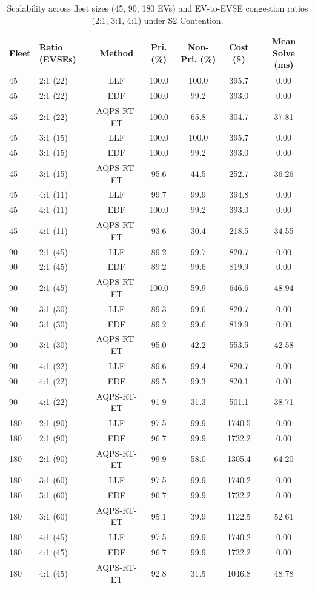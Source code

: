 \begin{table}[htbp]
\centering
\caption{Scalability across fleet sizes (45, 90, 180 EVs) and EV-to-EVSE congestion ratios (2:1, 3:1, 4:1) under S2 Contention.}
\label{tab:scalability}
\footnotesize
\begin{tabular}{llccccc}
\toprule
Fleet & Ratio (EVSEs) & Method & Pri. (\%) & Non-Pri. (\%) & Cost (\$) & Mean Solve (ms) \\
\midrule
45 & 2:1 (22) & LLF & 100.0 & 100.0 & 395.7 & 0.00 \\
45 & 2:1 (22) & EDF & 100.0 & 99.2 & 393.0 & 0.00 \\
45 & 2:1 (22) & AQPS-RT-ET & 100.0 & 65.8 & 304.7 & 37.81 \\
45 & 3:1 (15) & LLF & 100.0 & 100.0 & 395.7 & 0.00 \\
45 & 3:1 (15) & EDF & 100.0 & 99.2 & 393.0 & 0.00 \\
45 & 3:1 (15) & AQPS-RT-ET & 95.6 & 44.5 & 252.7 & 36.26 \\
45 & 4:1 (11) & LLF & 99.7 & 99.9 & 394.8 & 0.00 \\
45 & 4:1 (11) & EDF & 100.0 & 99.2 & 393.0 & 0.00 \\
45 & 4:1 (11) & AQPS-RT-ET & 93.6 & 30.4 & 218.5 & 34.55 \\
90 & 2:1 (45) & LLF & 89.2 & 99.7 & 820.7 & 0.00 \\
90 & 2:1 (45) & EDF & 89.2 & 99.6 & 819.9 & 0.00 \\
90 & 2:1 (45) & AQPS-RT-ET & 100.0 & 59.9 & 646.6 & 48.94 \\
90 & 3:1 (30) & LLF & 89.3 & 99.6 & 820.7 & 0.00 \\
90 & 3:1 (30) & EDF & 89.2 & 99.6 & 819.9 & 0.00 \\
90 & 3:1 (30) & AQPS-RT-ET & 95.0 & 42.2 & 553.5 & 42.58 \\
90 & 4:1 (22) & LLF & 89.6 & 99.4 & 820.7 & 0.00 \\
90 & 4:1 (22) & EDF & 89.5 & 99.3 & 820.1 & 0.00 \\
90 & 4:1 (22) & AQPS-RT-ET & 91.9 & 31.3 & 501.1 & 38.71 \\
180 & 2:1 (90) & LLF & 97.5 & 99.9 & 1740.5 & 0.00 \\
180 & 2:1 (90) & EDF & 96.7 & 99.9 & 1732.2 & 0.00 \\
180 & 2:1 (90) & AQPS-RT-ET & 99.9 & 58.0 & 1305.4 & 64.20 \\
180 & 3:1 (60) & LLF & 97.5 & 99.9 & 1740.2 & 0.00 \\
180 & 3:1 (60) & EDF & 96.7 & 99.9 & 1732.2 & 0.00 \\
180 & 3:1 (60) & AQPS-RT-ET & 95.1 & 39.9 & 1122.5 & 52.61 \\
180 & 4:1 (45) & LLF & 97.5 & 99.9 & 1740.2 & 0.00 \\
180 & 4:1 (45) & EDF & 96.7 & 99.9 & 1732.2 & 0.00 \\
180 & 4:1 (45) & AQPS-RT-ET & 92.8 & 31.5 & 1046.8 & 48.78 \\
\bottomrule
\end{tabular}
\end{table}